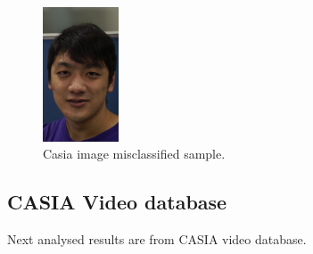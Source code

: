 \begin{figure}[htb]
\centering
\includegraphics[width=0.2\textwidth]{images_databases/casia_real_41.jpg}
\caption{Casia image misclassified sample.} \label{fig:casia_im_miscl}
\end{figure}

\subsection{CASIA Video database}
Next analysed results are from CASIA video database.\\


